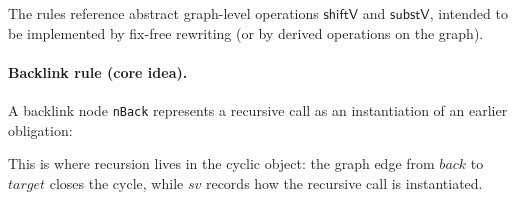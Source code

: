 The rules reference abstract graph-level operations \(\mathsf{shiftV}\) and \(\mathsf{substV}\), intended to be implemented by fix-free rewriting (or by derived operations on the graph).

\paragraph{Backlink rule (core idea).}
A backlink node \texttt{nBack} represents a recursive call as an instantiation of an earlier obligation:

\begin{center}
\begin{prooftree}
\end{prooftree}
\end{center}

This is where recursion lives in the cyclic object: the graph edge from \(\mathit{back}\) to \(\mathit{target}\) closes the cycle, while \(sv\) records how the recursive call is instantiated.
